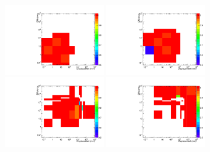 \begin{figure}[h!]
  \begin{center}
    \includegraphics[width=0.4\textwidth]{figures/LLPResults/systs/oddjetveto/Signal_SignalModels__longLivedAnalyzer__SMS-T1qqqqLL_ctau_10_mGluino-1000_mLSP-200_25ns__eff_oddjet_2D_log_num.pdf} 
    \includegraphics[width=0.4\textwidth]{figures/LLPResults/systs/oddjetveto/Signal_SignalModels__longLivedAnalyzer__SMS-T1qqqqLL_ctau_100_mGluino-1000_mLSP-200_25ns__eff_oddjet_2D_log_num.pdf} \\
    \includegraphics[width=0.4\textwidth]{figures/LLPResults/systs/oddjetveto/Signal_SignalModels__longLivedAnalyzer__SMS-T1qqqqLL_ctau_1000_mGluino-1000_mLSP-200_25ns__eff_oddjet_2D_log_num.pdf} 
    \includegraphics[width=0.4\textwidth]{figures/LLPResults/systs/oddjetveto/Signal_SignalModels__longLivedAnalyzer__SMS-T1qqqqLL_ctau_10000_mGluino-1000_mLSP-200_25ns__eff_oddjet_2D_log_num.pdf} \\

\end{center}
\end{figure}
